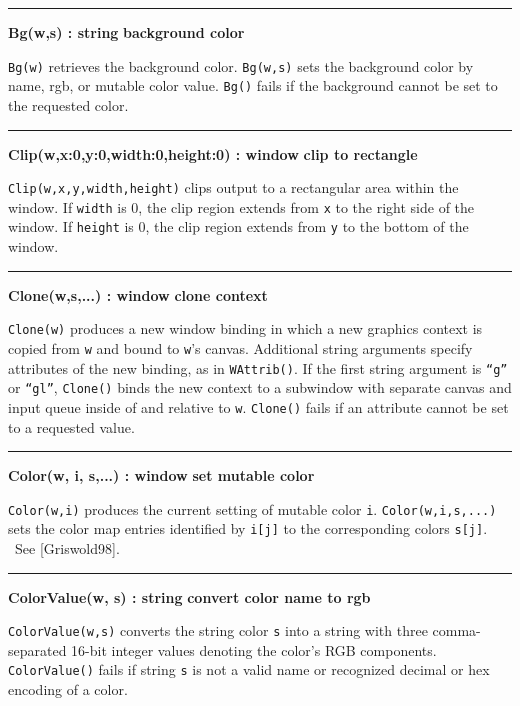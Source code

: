 \bigskip\hrule\vspace{0.1cm}
\noindent
{\bf Bg(w,s) : string } \hfill {\bf background color}

\noindent
\texttt{Bg(w)} retrieves the background color. \texttt{Bg(w,s)} sets the
background color by name, rgb, or mutable color value. \texttt{Bg()}
fails if the background cannot be set to the requested color.

\bigskip\hrule\vspace{0.1cm}
\noindent
{\bf Clip(w,x:0,y:0,width:0,height:0) : window } \hfill {\bf clip to rectangle}

\noindent
\texttt{Clip(w,x,y,width,height)} clips output to a rectangular area
within the window. If \texttt{width} is 0, the clip region extends
from \texttt{x} to the right side of the window. If \texttt{height}
is 0, the clip region extends from \texttt{y} to the bottom of the
window.

\bigskip\hrule\vspace{0.1cm}
\noindent
{\bf Clone(w,s,...) : window } \hfill {\bf clone context}

\noindent
\texttt{Clone(w)} produces a new window binding in which a new graphics
context is copied from \texttt{w} and bound to
\texttt{w}'s canvas. Additional string arguments
specify attributes of the new binding, as in \texttt{WAttrib()}. If the
first string argument is
\texttt{{\textquotedblleft}g{\textquotedblright}} or
\texttt{{\textquotedblleft}gl{\textquotedblright}}, \texttt{Clone()}
binds the new context to a subwindow with separate canvas and input
queue inside of and relative to \texttt{w}. \texttt{Clone()} fails if
an attribute cannot be set to a requested value.

\bigskip\hrule\vspace{0.1cm}
\noindent
{\bf Color(w, i, s,...) : window } \hfill {\bf set mutable color}

\noindent
\texttt{Color(w,i)} produces the current setting of mutable color
\texttt{i}. \texttt{Color(w,i,s,...)} sets the color map entries
identified by \texttt{i[j]} to the corresponding colors \texttt{s[j]}.
\ See [Griswold98].

\bigskip\hrule\vspace{0.1cm}
\noindent
{\bf ColorValue(w, s) : string } \hfill {\bf convert color name to rgb}

\noindent
\texttt{ColorValue(w,s)} converts the string color \texttt{s} into a
string with three comma-separated 16-bit integer values denoting the
color's RGB components. \texttt{ColorValue()} fails if
string \texttt{s} is not a valid name or recognized decimal or hex
encoding of a color.

